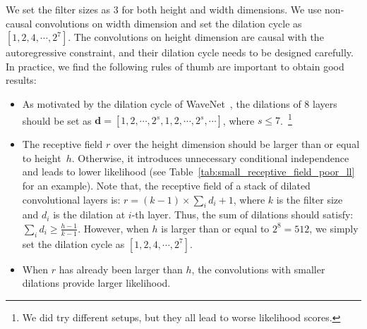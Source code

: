 \documentclass{article}
\newcommand{\vv}[1]{\boldsymbol{#1}}
\begin{document}
We set the filter sizes as 3 for both height and width dimensions.
We use non-causal convolutions on width dimension and set the dilation cycle as $[1, 2, 4, \cdots, 2^7]$.
The convolutions on height dimension are causal with the autoregressive constraint, 
and their dilation cycle needs to be designed carefully. In practice, we find the following rules of thumb are important to obtain good results:
\begin{itemize}[noitemsep,topsep=0pt, leftmargin=1.75em]
    \vspace{-0.1cm}
    \item As motivated by the dilation cycle of WaveNet~\citep{oord2016wavenet}, the dilations of 8 layers should be set as $\vv d = [1, 2, \cdots, 2^s, 1, 2, \cdots, 2^s, \cdots]$, where $s\le7$.~\footnote{We did try different setups, but they all lead to worse likelihood scores.}
\item The receptive field $r$ over the height dimension should be larger than or equal to height~$h$. Otherwise, it introduces unnecessary conditional independence and leads to lower likelihood (see Table~\ref{tab:small_receptive_field_poor_ll} for an example). 
    Note that, the receptive field of a stack of dilated convolutional layers is: $r = (k - 1) \times \sum_i d_i + 1$, where $k$ is the filter size and $d_i$ is the dilation at $i$-th layer. Thus, the sum of dilations should satisfy: $\sum_i d_i \ge \frac{h - 1}{k - 1}$.
    However, when $h$ is larger than or equal to $2^8 = 512$, we simply set the dilation cycle as $[1, 2, 4, \cdots, 2^7]$.
\item When $r$ has already been larger than $h$, the convolutions with smaller dilations provide larger likelihood.
    \vspace{-.2em}
\end{itemize}
\end{document}
